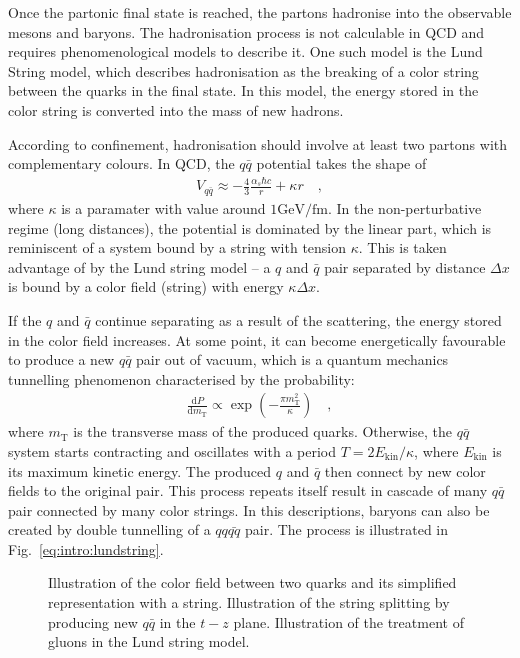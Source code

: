 Once the partonic final state is reached, the partons hadronise into the observable mesons and baryons. The hadronisation process is not calculable in QCD and requires phenomenological models to describe it. One such model is the Lund String model, which describes hadronisation as the breaking of a color string between the quarks in the final state. In this model, the energy stored in the color string is converted into the mass of new hadrons.

According to confinement, hadronisation should involve at least two partons with complementary colours. In QCD, the $q\bar{q}$ potential takes the shape of
\begin{align}
V_{q\bar{q}} \approx - \frac{4}{3}\frac{\alpha_s \hbar c}{r} + \kappa r \quad ,
\end{align}
where $\kappa$ is a paramater with value around $1 \mathrm{GeV} /\mathrm{fm}$. In the non-perturbative regime (long distances), the potential is dominated by the linear part, which is reminiscent of a system bound by a string with tension $\kappa$. This is taken advantage of by the Lund string model -- a $q$ and $\bar{q}$ pair separated by distance $\Delta x$ is bound by a color field (string) with energy $\kappa \Delta x$. 

If the $q$ and $\bar{q}$ continue separating as a result of the scattering, the energy stored in the color field increases. At some point, it can become energetically favourable to produce a new $q\bar{q}$ pair out of vacuum, which is a quantum mechanics tunnelling phenomenon characterised by the probability:
\begin{align}
\frac{\mathrm{d}P}{\mathrm{d}m_\mathrm{T}} \propto \exp \left( -\frac{\pi m_\mathrm{T}^2}{\kappa} \right) \quad ,
\label{eq:intro:tunnel}
\end{align}
where $m_\mathrm{T}$ is the transverse mass of the produced quarks. Otherwise, the $q\bar{q}$ system starts contracting and oscillates with a period $T = 2 E_\mathrm{kin}/\kappa$, where $E_\mathrm{kin}$ is its maximum kinetic energy. The produced $q$ and $\bar{q}$ then connect by new color fields to the original pair. This process repeats itself result in cascade of many $q\bar{q}$ pair connected by many color strings. In this descriptions, baryons can also be created by double tunnelling of a $qq\bar{qq}$ pair. The process is illustrated in Fig.~\ref{eq:intro:lundstring}.

\begin{figure}[H]
\caption{Illustration of the color field between two quarks and its simplified representation with a string. Illustration of the string splitting by producing new $q\bar{q}$ in the $t-z$ plane. Illustration of the treatment of gluons in the Lund string model.}
\label{fig:intro:lundstring}
\end{figure}

